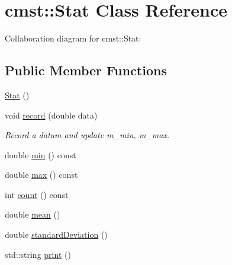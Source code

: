 \hypertarget{classcmst_1_1_stat}{}\section{cmst::Stat Class Reference}
\label{classcmst_1_1_stat}


Collaboration diagram for cmst::Stat:
\subsection*{Public Member Functions}
\begin{DoxyCompactItemize}
\item 
\hyperlink{classcmst_1_1_stat_a1f07a880a815c7efe4e4d244fb0c6b7d}{Stat} ()
\item 
void \hyperlink{classcmst_1_1_stat_ab1e2fe7c367da505a6b5f1fb5eb619d2}{record} (double data)
\begin{DoxyCompactList}\small\item\em Record a datum and update m\_min, m\_max. \end{DoxyCompactList}\item 
double \hyperlink{classcmst_1_1_stat_a1a6a92dee526145fb289d79a94afe3ae}{min} () const 
\item 
double \hyperlink{classcmst_1_1_stat_ab42898f6611aa9f1ad028f99c3d4242a}{max} () const 
\item 
int \hyperlink{classcmst_1_1_stat_ab8c6707fa4739fda8b27a2481df25c35}{count} () const 
\item 
double \hyperlink{classcmst_1_1_stat_aa40d8d516e7f866146d91866d63faf2b}{mean} ()
\item 
double \hyperlink{classcmst_1_1_stat_abfbaefc3a4174643a2eb282251fd86a5}{standardDeviation} ()
\item 
std::string \hyperlink{classcmst_1_1_stat_a03d1a0f52e2ea72cfab11a426726aea4}{print} ()
\end{DoxyCompactItemize}
